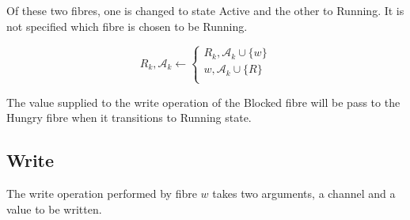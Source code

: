 \documentclass{article}
\begin{document}
\begin{enumerate}
Of these two
fibres, one is changed to state Active and the other to Running.
It is not specified which fibre is chosen to be Running.

\begin{equation}
R_k,{\mathcal A_k} \leftarrow
\begin{cases}
R_k,{\mathcal A_k} \cup \{w\} \\
w,{\mathcal A_k} \cup \{R\} \\
\end{cases}
\end{equation}

The value supplied to the write operation of the Blocked
fibre will be pass to the Hungry fibre when it transitions
to Running state.


\end{enumerate}



\subsection{Write}
The write operation performed by fibre $w$ takes two arguments, a channel and a value
to be written.
\end{document}
